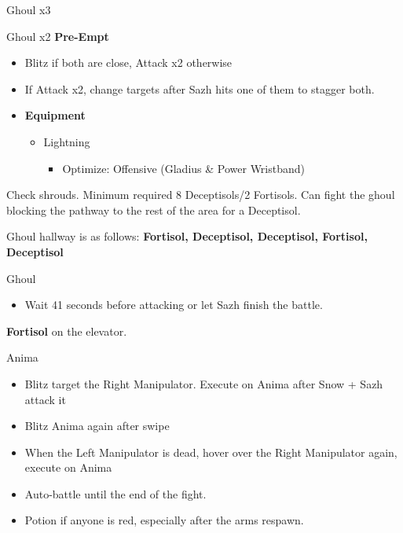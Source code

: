 	\begin{battle}[0:12]{Ghoul x3}
	\end{battle}

	\begin{battle}{Ghoul x2 \textbf{Pre-Empt}}
	\begin{itemize}
	    \item Blitz if both are close, Attack x2 otherwise
	    \item If Attack x2, change targets after Sazh hits one of them to stagger both.
	\end{itemize}
	\end{battle}

	
		\begin{menu}
		\begin{itemize}
			\item \textbf{Equipment}
			      \begin{itemize}
				      \item Lightning
				            \begin{itemize}
					            \item Optimize: Offensive (Gladius \& Power Wristband)
				            \end{itemize}
			      \end{itemize}
		\end{itemize}
	\end{menu}
	
	Check shrouds. Minimum required 8 Deceptisols/2 Fortisols. Can fight the ghoul blocking the pathway to the rest of the area for a Deceptisol.

	Ghoul hallway is as follows: {\bf Fortisol, Deceptisol, Deceptisol, Fortisol, Deceptisol}

	\begin{battle}[0:41]{Ghoul}
		\begin{itemize}
			\item Wait 41 seconds before attacking or let Sazh finish the battle.
		\end{itemize}
	\end{battle}

	\textbf{Fortisol} on the elevator.

	\begin{battle}[0:54]{Anima}

		\begin{itemize}
		    \item Blitz target the Right Manipulator. Execute on Anima after Snow + Sazh attack it
		    \item Blitz Anima again after swipe
		    \item When the Left Manipulator is dead, hover over the Right Manipulator again, execute on Anima
		    \item Auto-battle until the end of the fight.
		    \item Potion if anyone is red, especially after the arms respawn.
		\end{itemize}
	\end{battle}



